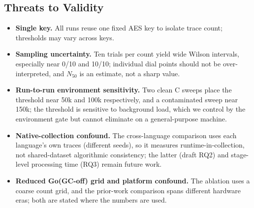 \subsection{Threats to Validity}
\label{sec:analysis-threats}
\begin{itemize}
  \item \textbf{Single key.} All runs reuse one fixed AES key to isolate trace
        count; thresholds may vary across keys.
  \item \textbf{Sampling uncertainty.} Ten trials per count yield wide Wilson
        intervals, especially near 0/10 and 10/10; individual dial points should
        not be over-interpreted, and $N_{50}$ is an estimate, not a sharp value.
  \item \textbf{Run-to-run environment sensitivity.} Two clean C sweeps place the
        threshold near 50k and 100k respectively, and a contaminated sweep near
        150k; the threshold is sensitive to background load, which we control by
        the environment gate but cannot eliminate on a general-purpose machine.
  \item \textbf{Native-collection confound.} The cross-language comparison uses
        each language's own traces (different seeds), so it measures
        runtime-in-collection, not shared-dataset algorithmic consistency;
        the latter (draft RQ2) and stage-level processing time (RQ3) remain
        future work.
  \item \textbf{Reduced Go(GC-off) grid and platform confound.} The ablation uses
        a coarse count grid, and the prior-work comparison spans different
        hardware eras; both are stated where the numbers are used.
\end{itemize}
